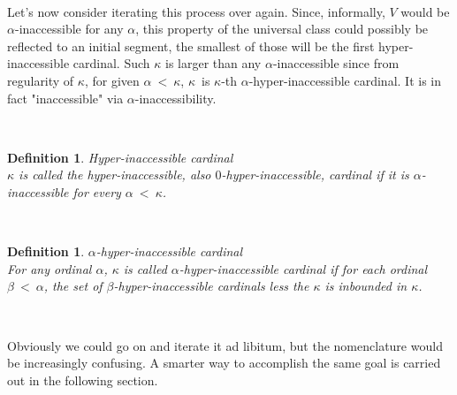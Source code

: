 \documentclass[12pt,a4paper]{article}
\newtheorem{definition}[theorem]{Definition}
\begin{document}
\begin{}
\

Let's now consider iterating this process over again. Since, informally, $V$ would be $\alpha$-inaccessible for any $\alpha$, this property of the universal class could possibly be reflected to an initial segment, the smallest of those will be the first hyper-inaccessible cardinal. Such $\kappa$ is larger than any $\alpha$-inaccessible since from regularity of $\kappa$, for given $\alpha\ <\ \kappa$, $\kappa$ is $\kappa$-th $\alpha$-hyper-inaccessible cardinal. It is in fact "inaccessible" via $\alpha$-inaccessibility.

\

\begin{definition}{Hyper-inaccessible cardinal}\\
$\kappa$ is called the hyper-inaccessible, also $0$-hyper-inaccessible, cardinal if it is $\alpha$-inaccessible for every $\alpha\ <\ \kappa$.
\end{definition}

\

\begin{definition}{$\alpha$-hyper-inaccessible cardinal}\\
For any ordinal $\alpha$, $\kappa$ is called $\alpha$-hyper-inaccessible cardinal if for each ordinal $\beta\ <\ \alpha$, the set of $\beta$-hyper-inaccessible cardinals less the $\kappa$ is inbounded in $\kappa$.
\end{definition}

\

Obviously we could go on and iterate it ad libitum, but the nomenclature would be increasingly confusing. A smarter way to accomplish the same goal is carried out in the following section.


{\color{red}
\begin{comment}


TODO tohle znamena, ze prvoradovou formuli nerozlisime $V$ od (prvniho) nedosazitelneho $\kappa$


\end{comment}}
\end{}
\end{document}
